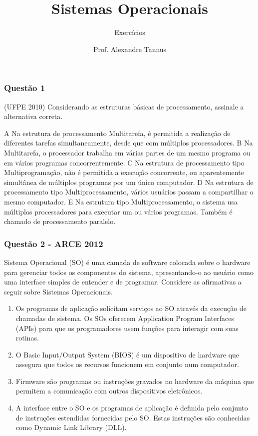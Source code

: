 \documentclass[aspectratio=169,
				xcolor=table]{beamer}
\title[]{Sistemas Operacionais}
\subtitle[]{Exercícios}
\author[]{Prof. Alexandre Tannus}
\date{}
\begin{document}
	\begin{frame}
		\titlepage
	\end{frame}

	\begin{frame}
		\tableofcontents		
	\end{frame}	
	
	\begin{frame}
		\frametitle{Questão 1}
		(UFPE 2010) Considerando as estruturas básicas de processamento, assinale a
alternativa correta.

A Na estrutura de processamento Multitarefa, é permitida a realização de diferentes tarefas
simultaneamente, desde que com múltiplos processadores.
B Na Multitarefa, o processador trabalha em várias partes de um mesmo programa ou em vários
programas concorrentemente.
C Na estrutura de processamento tipo Multiprogramação, não é permitida a execução concorrente,
ou aparentemente simultânea de múltiplos programas por um único computador.
D Na estrutura de processamento tipo Multiprocessamento, vários usuários passam a compartilhar o
mesmo computador.
E Na estrutura tipo Multiprocessamento, o sistema usa múltiplos processadores para executar um ou
vários programas. Também é chamado de processamento paralelo.
	\end{frame}	
	
	\begin{frame}
		\frametitle{Questão 2 - ARCE 2012}
		Sistema Operacional (SO) é uma camada de software colocada sobre o hardware para gerenciar todos os componentes do sistema, apresentando-o ao usuário como uma interface simples de entender e de programar. Considere as afirmativas a seguir sobre Sistemas Operacionais.

	\begin{enumerate}[I]
		\scriptsize
		\item Os programas de aplicação solicitam serviços ao SO através da execução de chamadas de sistema. Os SOs oferecem Application Program Interfaces (APIs) para que os programadores usem funções para interagir com suas rotinas.

		\item O Basic Input/Output System (BIOS) é um dispositivo de hardware que assegura que todos os recursos funcionem em conjunto num computador.

		\item Firmware são programas ou instruções gravados no hardware da máquina que permitem a comunicação com outros dispositivos eletrônicos.

		\item A interface entre o SO e os programas de aplicação é definida pelo conjunto de instruções estendidas fornecidas pelo SO. Estas instruções são conhecidas como Dynamic Link Library (DLL).

	\end{enumerate}

	\end{frame}
	
\end{document}
